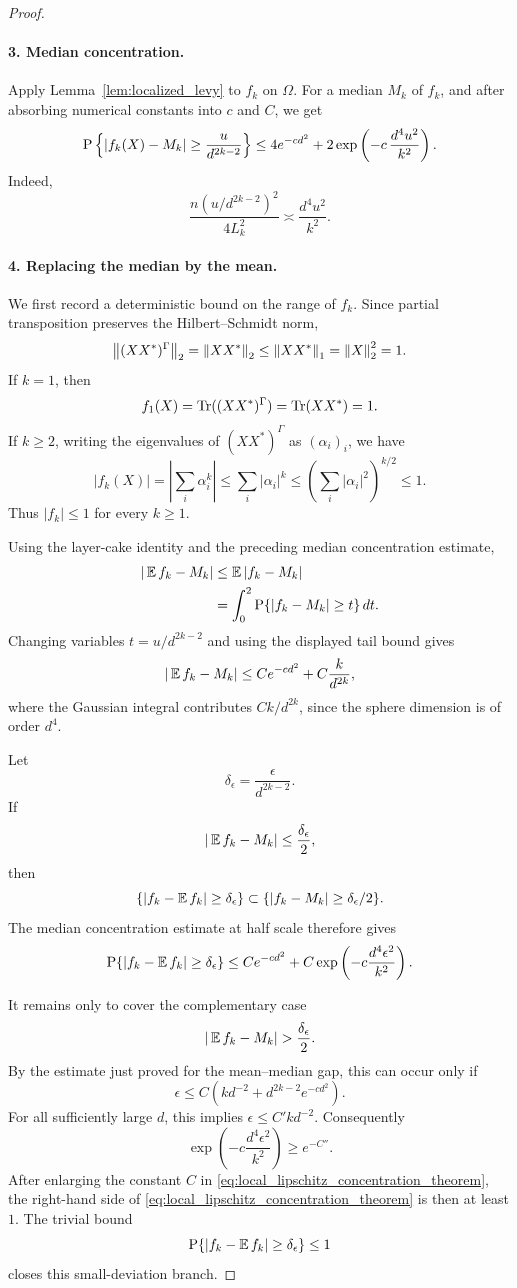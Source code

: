 \begin{proof}
\paragraph{3. Median concentration.}
Apply Lemma~\ref{lem:localized_levy} to \(f_k\) on \(\Omega\).  For a median
\(M_k\) of \(f_k\), and after absorbing numerical constants into \(c\) and
\(C\), we get
\[
    \operatorname{P}\left\{
      \left\lvert f_k(X)-M_k\right\rvert\ge \frac{u}{d^{2k-2}}
    \right\}
    \le
    4e^{-cd^2}
    +2\exp\left(
      -c\,\frac{d^4u^2}{k^2}
    \right).
\]
Indeed,
\[
    \frac{n(u/d^{2k-2})^2}{4L_k^2}
    \asymp
    \frac{d^4u^2}{k^2}.
\]

\paragraph{4. Replacing the median by the mean.}
We first record a deterministic bound on the range of \(f_k\).  Since partial
transposition preserves the Hilbert--Schmidt norm,
\[
    \left\lVert(XX^*)^\Gamma\right\rVert_2=\left\lVert XX^*\right\rVert_2\le \left\lVert XX^*\right\rVert_1=\left\lVert X\right\rVert_2^2=1.
\]
If \(k=1\), then
\[
    f_1(X)=\operatorname{Tr}((XX^*)^\Gamma)=\operatorname{Tr}(XX^*)=1.
\]
If \(k\ge2\), writing the eigenvalues of \((XX^*)^\Gamma\) as
\((\alpha_i)_i\), we have
\[
    |f_k(X)|
    =
    \left|\sum_i \alpha_i^k\right|
    \le
    \sum_i |\alpha_i|^k
    \le
    \left(\sum_i |\alpha_i|^2\right)^{k/2}
    \le 1.
\]
Thus \(|f_k|\le1\) for every \(k\ge1\).

Using the layer-cake identity and the preceding median concentration estimate,
\[
\begin{aligned}
    |\operatorname{\mathbb{E}} f_k-M_k|
    &\le
    \operatorname{\mathbb{E}}|f_k-M_k| \\
    &=
    \int_0^{2}\operatorname{P}\{|f_k-M_k|\ge t\}\,dt.
\end{aligned}
\]
Changing variables \(t=u/d^{2k-2}\) and using the displayed tail bound gives
\[
    |\operatorname{\mathbb{E}} f_k-M_k|
    \le
    C e^{-cd^2}
    +C\frac{k}{d^{2k}},
\]
where the Gaussian integral contributes \(Ck/d^{2k}\), since the sphere
dimension is of order \(d^4\).

Let
\[
    \delta_\epsilon=\frac{\epsilon}{d^{2k-2}}.
\]
If
\[
    |\operatorname{\mathbb{E}} f_k-M_k|\le \frac{\delta_\epsilon}{2},
\]
then
\[
    \{|f_k-\operatorname{\mathbb{E}} f_k|\ge\delta_\epsilon\}
    \subset
    \{|f_k-M_k|\ge\delta_\epsilon/2\}.
\]
The median concentration estimate at half scale therefore gives
\[
    \operatorname{P}\{|f_k-\operatorname{\mathbb{E}} f_k|\ge\delta_\epsilon\}
    \le
    C e^{-cd^2}
    +C\exp\left(-c\frac{d^4\epsilon^2}{k^2}\right).
\]

It remains only to cover the complementary case
\[
    |\E f_k-M_k|> \frac{\delta_\epsilon}{2}.
\]
By the estimate just proved for the mean--median gap, this can occur only if
\[
    \epsilon
    \le
    C\left(kd^{-2}+d^{2k-2}e^{-cd^2}\right).
\]
For all sufficiently large \(d\), this implies \(\epsilon\le C'k d^{-2}\).
Consequently
\[
    \exp\left(-c\frac{d^4\epsilon^2}{k^2}\right)
    \ge e^{-C''}.
\]
After enlarging the constant \(C\) in
\eqref{eq:local_lipschitz_concentration_theorem}, the right-hand side of
\eqref{eq:local_lipschitz_concentration_theorem} is then at least \(1\).
The trivial bound
\[
    \operatorname{P}\{|f_k-\operatorname{\mathbb{E}} f_k|\ge\delta_\epsilon\}\le1
\]
closes this small-deviation branch.
\end{proof}

